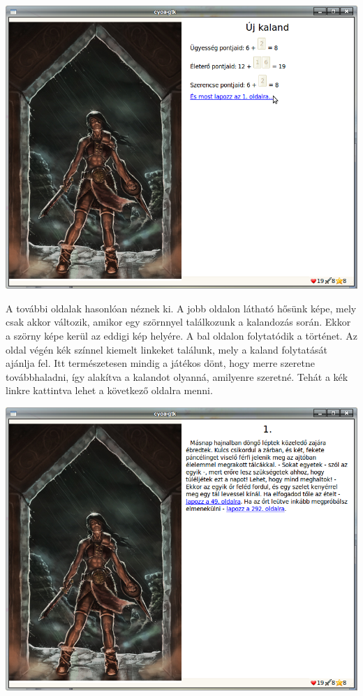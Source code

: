 \documentclass[12pt,a4paper,oneside]{report}
\begin{document}
        \includegraphics[scale=0.5]{screenshot_003.png}

        A további oldalak hasonlóan néznek ki. A jobb oldalon látható
        hősünk képe, mely csak akkor változik, amikor egy szörnnyel
        találkozunk a kalandozás során. Ekkor a szörny képe kerül az
        eddigi kép helyére. A bal oldalon folytatódik a
        történet. Az oldal végén kék színnel kiemelt linkeket
        találunk, mely a kaland folytatását ajánlja fel. Itt
        természetesen mindig a játékos dönt, hogy merre szeretne
        továbbhaladni, így alakítva a kalandot olyanná, amilyenre
        szeretné. Tehát a kék linkre kattintva lehet a következő
        oldalra menni.

        \includegraphics[scale=0.5]{screenshot_005.png}
\end{document}
